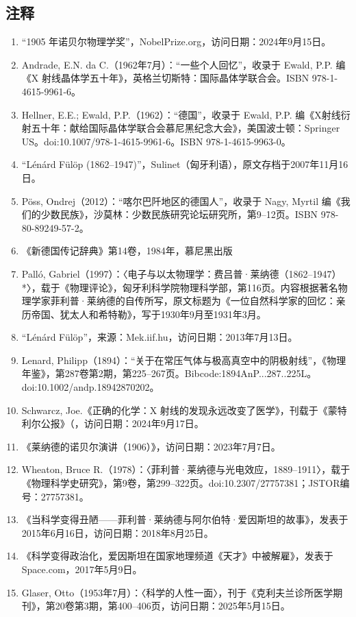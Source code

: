 \subsection{注释}
\begin{enumerate}
\item  “1905 年诺贝尔物理学奖”，NobelPrize.org，访问日期：2024年9月15日。
\item  Andrade, E.N. da C.（1962年7月）：“一些个人回忆”，收录于 Ewald, P.P. 编《X 射线晶体学五十年》，英格兰切斯特：国际晶体学联合会。ISBN 978-1-4615-9961-6。
\item  Hellner, E.E.; Ewald, P.P.（1962）：“德国”，收录于 Ewald, P.P. 编《X射线衍射五十年：献给国际晶体学联合会慕尼黑纪念大会》，美国波士顿：Springer US。doi:10.1007/978-1-4615-9961-6。ISBN 978-1-4615-9963-0。
\item “Lénárd Fülöp (1862–1947)”，Sulinet（匈牙利语），原文存档于2007年11月16日。
\item  Pöss, Ondrej（2012）：“喀尔巴阡地区的德国人”，收录于 Nagy, Myrtil 编《我们的少数民族》，沙莫林：少数民族研究论坛研究所，第9–12页。ISBN 978-80-89249-57-2。
\item 《新德国传记辞典》第14卷，1984年，慕尼黑出版
\item Palló, Gabriel（1997）：〈电子与以太物理学：费吕普·莱纳德（1862–1947）*〉，载于《物理评论》，匈牙利科学院物理科学部，第116页。内容根据著名物理学家菲利普·莱纳德的自传所写，原文标题为《一位自然科学家的回忆：亲历帝国、犹太人和希特勒》，写于1930年9月至1931年3月。
\item “Lénárd Fülöp”，来源：Mek.iif.hu，访问日期：2013年7月13日。
\item Lenard, Philipp（1894）：“关于在常压气体与极高真空中的阴极射线”，《物理年鉴》，第287卷第2期，第225–267页。Bibcode:1894AnP...287..225L。doi:10.1002/andp.18942870202。
\item Schwarcz, Joe.《正确的化学：X 射线的发现永远改变了医学》，刊载于《蒙特利尔公报》（，访问日期：2024年9月17日。
\item 《莱纳德的诺贝尔演讲（1906）》，访问日期：2023年7月7日。
\item Wheaton, Bruce R.（1978）：〈菲利普·莱纳德与光电效应，1889–1911〉，载于《物理科学史研究》，第9卷，第299–322页。doi:10.2307/27757381；JSTOR编号：27757381。
\item 《当科学变得丑陋——菲利普·莱纳德与阿尔伯特·爱因斯坦的故事》，发表于2015年6月16日，访问日期：2018年8月25日。
\item 《科学变得政治化，爱因斯坦在国家地理频道《天才》中被解雇》，发表于 Space.com，2017年5月9日。
\item Glaser, Otto（1953年7月）：〈科学的人性一面〉，刊于《克利夫兰诊所医学期刊》，第20卷第3期，第400–406页，访问日期：2025年5月15日。

\end{enumerate}
